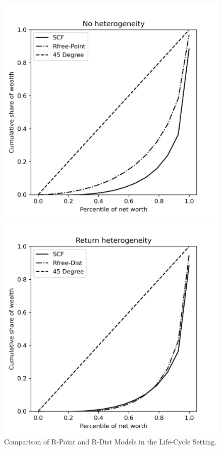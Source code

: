 \begin{figure}[h]
    \centering
    \begin{minipage}{0.48\textwidth}
        \centering
        \includegraphics[width=\textwidth]{../Figures/LCrrPointNetWorthPlot.png}
    \end{minipage}
    \hfill
    \begin{minipage}{0.48\textwidth}
        \centering
        \includegraphics[width=\textwidth]{../Figures/LCrrDistNetWorthPlot.png}
    \end{minipage}
    \caption{Comparison of R-Point and R-Dist Models in the Life-Cycle Setting.}
    \label{fig:LCUnif} 
  \end{figure}

